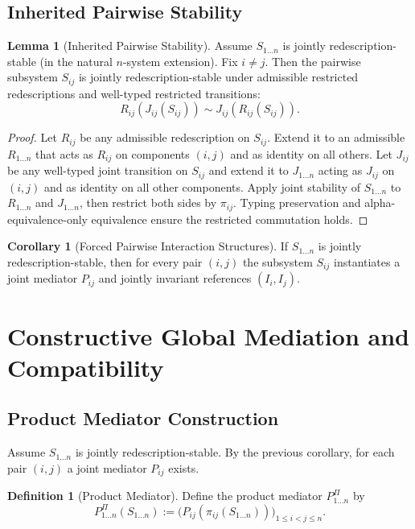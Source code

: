 \documentclass[11pt]{article}
\theoremstyle{definition}
\newtheorem{definition}{Definition}
\newtheorem{lemma}{Lemma}
\newtheorem{corollary}{Corollary}
\begin{document}
\subsection{Inherited Pairwise Stability}

\begin{lemma}[Inherited Pairwise Stability]
Assume $S_{1\ldots n}$ is jointly redescription-stable (in the natural $n$-system extension).
Fix $i\neq j$. Then the pairwise subsystem $S_{ij}$ is jointly redescription-stable under admissible restricted redescriptions and well-typed restricted transitions:
\[
R_{ij}(J_{ij}(S_{ij}))\sim J_{ij}(R_{ij}(S_{ij})).
\]
\end{lemma}

\begin{proof}
Let $R_{ij}$ be any admissible redescription on $S_{ij}$. Extend it to an admissible $R_{1\ldots n}$ that acts as $R_{ij}$ on components $(i,j)$ and as identity on all others.
Let $J_{ij}$ be any well-typed joint transition on $S_{ij}$ and extend it to $J_{1\ldots n}$ acting as $J_{ij}$ on $(i,j)$ and as identity on all other components.
Apply joint stability of $S_{1\ldots n}$ to $R_{1\ldots n}$ and $J_{1\ldots n}$, then restrict both sides by $\pi_{ij}$. Typing preservation and alpha-equivalence-only
equivalence ensure the restricted commutation holds.
\end{proof}

\begin{corollary}[Forced Pairwise Interaction Structures]
If $S_{1\ldots n}$ is jointly redescription-stable, then for every pair $(i,j)$ the subsystem $S_{ij}$ instantiates a joint mediator $P_{ij}$ and jointly invariant references $(I_i,I_j)$.
\end{corollary}

\section{Constructive Global Mediation and Compatibility}

\subsection{Product Mediator Construction}

Assume $S_{1\ldots n}$ is jointly redescription-stable. By the previous corollary, for each pair $(i,j)$ a joint mediator $P_{ij}$ exists.

\begin{definition}[Product Mediator]
Define the product mediator $P^{\Pi}_{1\ldots n}$ by
\[
P^{\Pi}_{1\ldots n}(S_{1\ldots n})
:=
\bigl(P_{ij}(\pi_{ij}(S_{1\ldots n}))\bigr)_{1\le i<j\le n}.
\]
\end{definition}
\end{document}
